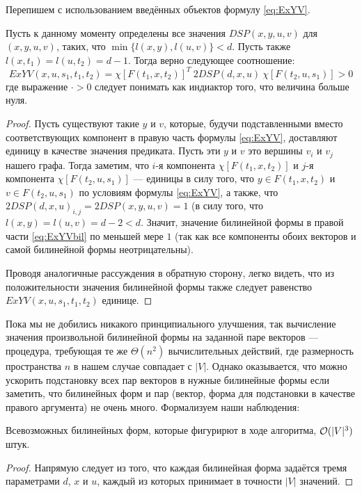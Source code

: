 Перепишем с использованием введённых объектов формулу \eqref{eq:ExYV}.

\begin{proposition}
Пусть к данному моменту определены все значения $DSP(x, y, u, v)$ для $(x, y, u, v)$, таких, что $\min\{l(x, y), l(u, v)\} < d$. Пусть также $l(x, t_1) = l(u, t_2) = d - 1$. Тогда верно следующее соотношение:
\begin{equation}
ExYV(x, u, s_1, t_1, t_2) = \chi[F(t_1, x, t_2)]^T~2DSP(d,x,u)~\chi[F(t_2, u, s_1)] > 0 \label{eq:ExYVbil}
\end{equation}
где выражение $\cdot > 0$ следует понимать как индиактор того, что величина больше нуля.
\end{proposition}
\begin{proof}
Пусть существуют такие $y$ и $v$, которые, будучи подставленными вместо соответствующих компонент в правую часть формулы \eqref{eq:ExYV}, доставляют единицу в качестве значения предиката. Пусть эти $y$ и $v$ это вершины $v_i$ и $v_j$ нашего графа. Тогда заметим, что $i$-я компонента $\chi[F(t_1, x, t_2)]$ и $j$-я компонента $\chi[F(t_2, u, s_1)]$ --- единицы в силу того, что $y \in F(t_1, x, t_2)$ и $v \in F(t_2, u, s_1)$ по условиям формулы \eqref{eq:ExYV}, а также, что $2DSP(d, x, u)_{i,j} = 2DSP(x, y, u, v) = 1$ (в силу того, что $l(x, y) = l(u, v) = d - 2 < d$. Значит, значение билинейной формы в правой части \eqref{eq:ExYVbil} по меньшей мере $1$ (так как все компоненты обоих векторов и самой билинейной формы неотрицательны).

Проводя аналогичные рассуждения в обратную сторону, легко видеть, что из положительности значения билинейной формы также следует равенство $ExYV(x, u, s_1, t_1, t_2)$ единице.
\end{proof}

Пока мы не добились никакого принципиального улучшения, так вычисление значения произвольной билинейной формы на заданной паре векторов --- процедура, требующая те же $\Theta(n^2)$ вычислительных действий, где размерность пространства $n$ в нашем случае совпадает с $|V|$. Однако оказывается, что можно ускорить подстановку всех пар векторов в нужные билинейные формы если заметить, что билинейных форм и пар (вектор, форма для подстановки в качестве правого аргумента) не очень много. Формализуем наши наблюдения:

\begin{proposition}
Всевозможных билинейных форм, которые фигурирют в ходе алгоритма, $\mathcal{O}(|V|^3)$ штук.
\end{proposition}
\begin{proof}
Напрямую следует из того, что каждая билинейная форма задаётся тремя параметрами $d$, $x$ и $u$, каждый из которых принимает в точности $|V|$ значений.
\end{proof}

